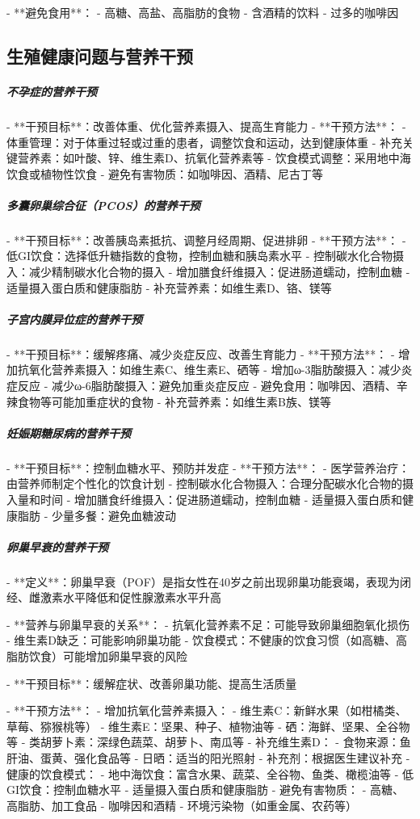 \begin{enumerate}
- **避免食用**：
  - 高糖、高盐、高脂肪的食物
  - 含酒精的饮料
  - 过多的咖啡因

\subsection{生殖健康问题与营养干预}

\subparagraph{不孕症的营养干预}

- **干预目标**：改善体重、优化营养素摄入、提高生育能力
- **干预方法**：
  - 体重管理：对于体重过轻或过重的患者，调整饮食和运动，达到健康体重
  - 补充关键营养素：如叶酸、锌、维生素D、抗氧化营养素等
  - 饮食模式调整：采用地中海饮食或植物性饮食
  - 避免有害物质：如咖啡因、酒精、尼古丁等

\subparagraph{多囊卵巢综合征（PCOS）的营养干预}

- **干预目标**：改善胰岛素抵抗、调整月经周期、促进排卵
- **干预方法**：
  - 低GI饮食：选择低升糖指数的食物，控制血糖和胰岛素水平
  - 控制碳水化合物摄入：减少精制碳水化合物的摄入
  - 增加膳食纤维摄入：促进肠道蠕动，控制血糖
  - 适量摄入蛋白质和健康脂肪
  - 补充营养素：如维生素D、铬、镁等

\subparagraph{子宫内膜异位症的营养干预}

- **干预目标**：缓解疼痛、减少炎症反应、改善生育能力
- **干预方法**：
  - 增加抗氧化营养素摄入：如维生素C、维生素E、硒等
  - 增加ω-3脂肪酸摄入：减少炎症反应
  - 减少ω-6脂肪酸摄入：避免加重炎症反应
  - 避免食用：咖啡因、酒精、辛辣食物等可能加重症状的食物
  - 补充营养素：如维生素B族、镁等

\subparagraph{妊娠期糖尿病的营养干预}

- **干预目标**：控制血糖水平、预防并发症
- **干预方法**：
  - 医学营养治疗：由营养师制定个性化的饮食计划
  - 控制碳水化合物摄入：合理分配碳水化合物的摄入量和时间
  - 增加膳食纤维摄入：促进肠道蠕动，控制血糖
  - 适量摄入蛋白质和健康脂肪
  - 少量多餐：避免血糖波动

\subparagraph{卵巢早衰的营养干预}

- **定义**：卵巢早衰（POF）是指女性在40岁之前出现卵巢功能衰竭，表现为闭经、雌激素水平降低和促性腺激素水平升高

- **营养与卵巢早衰的关系**：
  - 抗氧化营养素不足：可能导致卵巢细胞氧化损伤
  - 维生素D缺乏：可能影响卵巢功能
  - 饮食模式：不健康的饮食习惯（如高糖、高脂肪饮食）可能增加卵巢早衰的风险

- **干预目标**：缓解症状、改善卵巢功能、提高生活质量

- **干预方法**：
  - 增加抗氧化营养素摄入：
    - 维生素C：新鲜水果（如柑橘类、草莓、猕猴桃等）
    - 维生素E：坚果、种子、植物油等
    - 硒：海鲜、坚果、全谷物等
    - 类胡萝卜素：深绿色蔬菜、胡萝卜、南瓜等
  - 补充维生素D：
    - 食物来源：鱼肝油、蛋黄、强化食品等
    - 日晒：适当的阳光照射
    - 补充剂：根据医生建议补充
  - 健康的饮食模式：
    - 地中海饮食：富含水果、蔬菜、全谷物、鱼类、橄榄油等
    - 低GI饮食：控制血糖水平
    - 适量摄入蛋白质和健康脂肪
  - 避免有害物质：
    - 高糖、高脂肪、加工食品
    - 咖啡因和酒精
    - 环境污染物（如重金属、农药等）


\end{enumerate}
